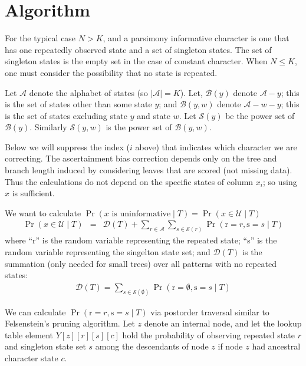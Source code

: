 \documentclass[11pt]{article}
\begin{document}
\section*{Algorithm}
For the typical case $N > K$, and a parsimony informative character 
is one that has one repeatedly observed state and a set of singleton states. 
The set of singleton states is the empty set in the case of 
	constant character.
When $N \leq K$, one must consider the possibility that no state is repeated.

Let $\mathcal{A}$ denote the alphabet of states (so $|\mathcal{A}| = K$).
Let, $\mathcal{B}(y)$ denote $\mathcal{A} - y$; this is the set of 
	states other than some state $y$; and
	$\mathcal{B}(y, w)$ denote $\mathcal{A} - w - y$; this is the set of states excluding state $y$ and state $w$.
Let $\mathcal{S}(y)$ be the power set of $\mathcal{B}(y)$.
Similarly $\mathcal{S}(y, w)$ is the power set of $\mathcal{B}(y, w)$.

Below we will suppress the index ($i$ above) that indicates which character we are correcting.
The ascertainment bias correction depends only on the tree and branch length induced by considering leaves that are scored (not missing data).
Thus the calculations do not depend on the specific states of column
$x_i$; so using $x$ is sufficient.

We want to calculate $\Pr(x\mbox{ is uninformative}\mid T) = \Pr(x\in \mathcal{U}\mid T)$
\begin{eqnarray*}
\Pr(x\in \mathcal{U}\mid T) & = & \mathcal{D}(T) + \sum_{r\in \mathcal{A}}\sum_{s\in\mathcal{S}(r)}\Pr(\mbox{r}=r, \mbox{s}=s\mid T)
\end{eqnarray*}
where ``r'' is the random variable representing the repeated state; ``s'' is the random variable representing the singelton state set; and 
$\mathcal{D}(T)$ is the summation (only needed for small trees) over
all patterns with no repeated states:
\begin{eqnarray*}
\mathcal{D}(T) = \sum_{s\in\mathcal{S}(\emptyset)}\Pr(\mbox{r}=\emptyset, \mbox{s}=s\mid T)
\end{eqnarray*}


We can calculate $\Pr(\mbox{r}=r, \mbox{s}=s\mid T)$ via postorder traversal similar to Felsenstein's pruning algorithm.
Let $z$ denote an internal node, and let the lookup table element
$Y[z][r][s][c]$ hold
the probability of observing repeated state $r$ and singleton state set $s$ among the descendants of node $z$ if node $z$ had ancestral
character state $c$.
\end{document}

